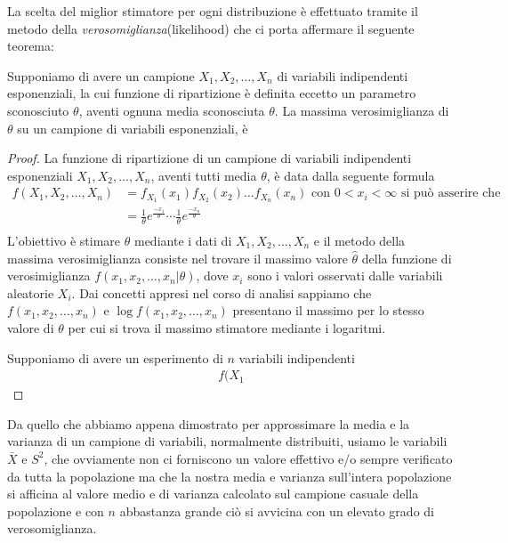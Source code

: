 \documentclass[a4paper,12pt, oneside]{book}
\begin{document}
La scelta del miglior stimatore per ogni distribuzione è effettuato tramite il metodo della
\emph{verosomiglianza}(likelihood) che ci porta affermare il seguente teorema:
\begin{teo}
    Supponiamo di avere un campione $X_1, X_2, \dots, X_n$ di variabili indipendenti esponenziali, la cui funzione
    di ripartizione è definita eccetto un parametro sconosciuto $\theta$, aventi ognuna media sconosciuta $\theta$.\newline
    La massima verosimiglianza di $\theta$ su un campione di variabili esponenziali, è

\end{teo}
\begin{proof}
    La funzione di ripartizione di un campione di variabili indipendenti esponenziali $X_1, X_2, \dots, X_n$, aventi 
    tutti media $\theta$, è data dalla seguente formula
    \[ \begin{split}
        f(X_1, X_2, \dots, X_n) & = f_{X_1}(x_1) f_{X_2}(x_2) \dots f_{X_n}(x_n) \mbox{ con $0 < x_i <\infty$ si può asserire che}\\
                                & = \frac{1}{\theta}e^{\frac{-x_1}{\theta}} \cdots \frac{1}{\theta} e^{\frac{-x_n}{\theta}}\\
       \end{split} \]
    L'obiettivo è stimare $\theta$ mediante i dati di $X_1, X_2, \dots, X_n$ e il metodo della massima verosimiglianza
    consiste nel trovare il massimo valore $\hat{\theta}$ della funzione di verosimiglianza $f(x_1, x_2, \dots, x_n | \theta)$, dove
    $x_i$ sono i valori osservati dalle variabili aleatorie $X_i$.\newline
    Dai concetti appresi nel corso di analisi sappiamo che $f(x_1, x_2, \dots, x_n)$ e $\log f(x_1, x_2, \dots, x_n)$
    presentano il massimo per lo stesso valore di $\theta$ per cui si trova il massimo stimatore mediante i logaritmi.

    Supponiamo di avere un esperimento di $n$ variabili indipendenti 
    \[ \begin{split}
        f(X_1
       \end{split} \]
    \end{proof}
Da quello che abbiamo appena dimostrato per approssimare la media e la varianza di un campione di variabili, normalmente
distribuiti, usiamo le variabili $\bar{X}$ e $S^2$, che ovviamente non ci forniscono un valore effettivo e/o sempre
verificato da tutta la popolazione ma che la nostra media e varianza sull'intera popolazione si afficina al valore medio
e di varianza calcolato sul campione casuale della popolazione e con $n$ abbastanza grande ciò si avvicina con un
elevato grado di verosomiglianza.
\end{document}
